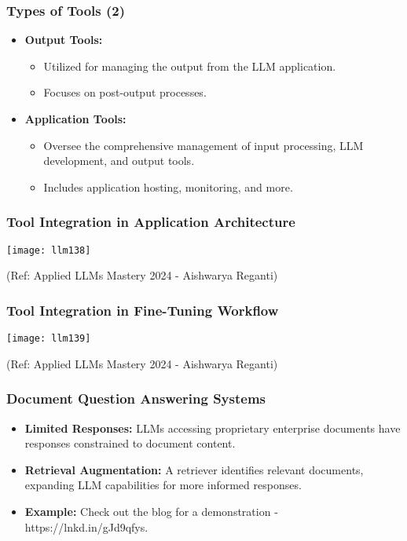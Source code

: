 \begin{frame}[fragile]\frametitle{Types of Tools (2)}
  \begin{itemize}
    \item \textbf{Output Tools:}
      \begin{itemize}
        \item Utilized for managing the output from the LLM application.
        \item Focuses on post-output processes.
      \end{itemize}
    \item \textbf{Application Tools:}
      \begin{itemize}
        \item Oversee the comprehensive management of input processing, LLM development, and output tools.
        \item Includes application hosting, monitoring, and more.
      \end{itemize}
  \end{itemize}
\end{frame}


\begin{frame}[fragile]\frametitle{Tool Integration in Application Architecture}
\begin{center}
\texttt{[image: llm138]}
\end{center}				

{\tiny (Ref: Applied LLMs Mastery 2024 - Aishwarya Reganti)}
\end{frame}

\begin{frame}[fragile]\frametitle{Tool Integration in Fine-Tuning Workflow}
\begin{center}
\texttt{[image: llm139]}
\end{center}				

{\tiny (Ref: Applied LLMs Mastery 2024 - Aishwarya Reganti)}
\end{frame}


\begin{frame}[fragile]\frametitle{Document Question Answering Systems}

\begin{itemize}
  \item \textbf{Limited Responses:} LLMs accessing proprietary enterprise documents have responses constrained to document content.
  
  \item \textbf{Retrieval Augmentation:} A retriever identifies relevant documents, expanding LLM capabilities for more informed responses.
  
  \item \textbf{Example:} Check out the blog for a demonstration - https://lnkd.in/gJd9qfys.
\end{itemize}

\end{frame}


